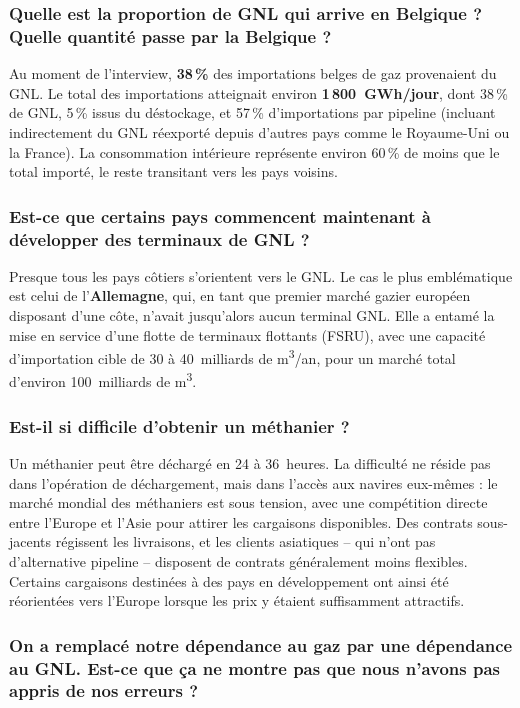 \subsubsection{Quelle est la proportion de GNL qui arrive en Belgique ? Quelle quantité passe par la Belgique ?}

Au moment de l'interview, \textbf{38\,\%} des importations belges de gaz provenaient du GNL. Le total des importations atteignait environ \textbf{1\,800~GWh/jour}, dont 38\,\% de GNL, 5\,\% issus du déstockage, et 57\,\% d'importations par pipeline (incluant indirectement du GNL réexporté depuis d'autres pays comme le Royaume-Uni ou la France). La consommation intérieure représente environ 60\,\% de moins que le total importé, le reste transitant vers les pays voisins.

\subsubsection{Est-ce que certains pays commencent maintenant à développer des terminaux de GNL ?}

Presque tous les pays côtiers s'orientent vers le GNL. Le cas le plus emblématique est celui de l'\textbf{Allemagne}, qui, en tant que premier marché gazier européen disposant d'une côte, n'avait jusqu'alors aucun terminal GNL. Elle a entamé la mise en service d'une flotte de terminaux flottants (FSRU), avec une capacité d'importation cible de 30 à 40~milliards de m\textsuperscript{3}/an, pour un marché total d'environ 100~milliards de m\textsuperscript{3}.

\subsubsection{Est-il si difficile d'obtenir un méthanier ?}

Un méthanier peut être déchargé en 24 à 36~heures. La difficulté ne réside pas dans l'opération de déchargement, mais dans l'accès aux navires eux-mêmes : le marché mondial des méthaniers est sous tension, avec une compétition directe entre l'Europe et l'Asie pour attirer les cargaisons disponibles. Des contrats sous-jacents régissent les livraisons, et les clients asiatiques -- qui n'ont pas d'alternative pipeline -- disposent de contrats généralement moins flexibles. Certains cargaisons destinées à des pays en développement ont ainsi été réorientées vers l'Europe lorsque les prix y étaient suffisamment attractifs.

\subsubsection{On a remplacé notre dépendance au gaz par une dépendance au GNL. Est-ce que ça ne montre pas que nous n'avons pas appris de nos erreurs ?}

